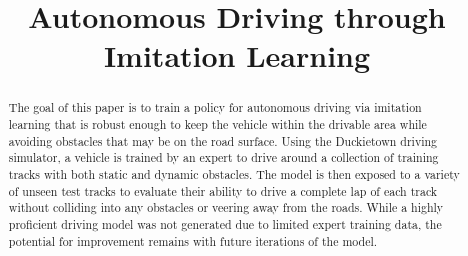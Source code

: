 \documentclass[conference]{IEEEtran}
\begin{document}
\title{Autonomous Driving through Imitation Learning}

\author{
}


\maketitle

\begin{abstract}
The goal of this paper is to train a policy for autonomous driving via imitation learning 
that is robust enough to keep the vehicle within the drivable area while avoiding obstacles 
that may be on the road surface. Using the Duckietown driving simulator, a vehicle is trained 
by an expert to drive around a collection of training tracks with both static and dynamic obstacles.
The model is then exposed to a variety of unseen test tracks to evaluate their ability to 
drive a complete lap of each track without colliding into any obstacles or veering away from the
roads. While a highly proficient driving model was not generated due to limited expert training data,
the potential for improvement remains with future iterations of the model.
\end{abstract}

\IEEEpeerreviewmaketitle
\end{document}
